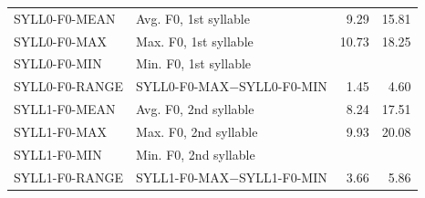 \begin{table}[htb]
{\begin{tabularx}{\textwidth}{p{}Xrr}
		SYLL0-F0-MEAN	& Avg. F0, 1st syllable					& 9.29		& 15.81\\	
		SYLL0-F0-MAX		& Max. F0, 1st syllable					& 10.73		& 18.25\\
		SYLL0-F0-MIN		& Min. F0, 1st syllable					& \color{red}{TD}		& \color{red}{TD}\\
		SYLL0-F0-RANGE & SYLL0-F0-MAX$-$SYLL0-F0-MIN	& 1.45		& 4.60\\

		SYLL1-F0-MEAN	& Avg. F0, 2nd syllable						& 8.24		& 17.51\\
		SYLL1-F0-MAX		& Max. F0, 2nd syllable						& 9.93		& 20.08\\
		SYLL1-F0-MIN		& Min. F0, 2nd syllable			& \color{red}{TD}	& \color{red}{TD}\\
		SYLL1-F0-RANGE	& SYLL1-F0-MAX$-$SYLL1-F0-MIN 	& 3.66		& 5.86 \\
		

\end{tabularx}}
\end{table}
